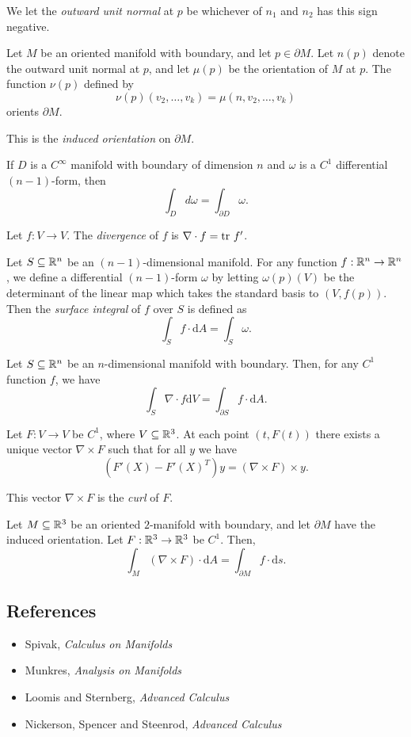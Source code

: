 \begin{defn}
    We let the \emph{outward unit normal} at $p$ be whichever of $n_1$ and $n_2$
    has this sign negative.
\end{defn}
\begin{prop}
    Let $M$ be an oriented manifold with boundary, and let $p\in\partial M$.
    Let $n(p)$ denote the outward unit normal at $p$, and let $\mu(p)$ be the
    orientation of $M$ at $p$. The function $\nu(p)$ defined by
    \[\nu(p)(v_2,\ldots,v_k)=\mu(n,v_2,\ldots,v_k)\] orients $\partial M$.
\end{prop}
\begin{defn}
    This is the \emph{induced orientation} on $\partial M$.
\end{defn}
\begin{thm}[Stokes]
    If $D$ is a $C^\infty$ manifold with boundary of dimension $n$ and $\omega$ is
    a $C^1$ differential $(n-1)$-form, then
    \[\int_D d\omega=\int_{\partial D}\omega.\]
\end{thm}
\begin{defn}
    Let $f:V\to V$. The \emph{divergence} of $f$ is $\nabla\cdot f=\mathrm{tr}\  f'$.
\end{defn}
\begin{defn}
    Let $S\subseteq\mathbb{R}^n$ be an $(n-1)$-dimensional manifold. For any function
    $f:\mathbb{R}^n\to\mathbb{R}^n$, we define a differential $(n-1)$-form $\omega$ by letting
    $\omega(p)(V)$ be the determinant of the linear map which
    takes the standard basis to $(V,f(p))$. Then the \emph{surface integral} of
    $f$ over $S$ is defined as
    \[\int_S f\cdot\mathrm dA=\int_S\omega.\]
\end{defn}
\begin{thm}
    Let $S\subseteq\mathbb{R}^n$ be an $n$-dimensional
    manifold with boundary. Then, for any $C^1$ function $f$, we have
    \[\int_S \nabla\cdot f\mathrm dV=\int_{\partial S}f\cdot\mathrm dA.\]
\end{thm}
\begin{prop}
    Let $F:V\to V$ be $C^1$, where $V\subseteq\mathbb{R}^3$. At each point $(t,F(t))$
    there exists a unique vector $\nabla\times F$ such that for all $y$ we have
    \[(F'(X)-F'(X)^T)y=(\nabla\times F)\times y.\]
\end{prop}
\begin{defn}
    This vector $\nabla\times F$ is the \emph{curl} of $F$.
\end{defn}
\begin{thm}[Stokes]
    Let $M\subseteq\mathbb{R}^3$ be an oriented $2$-manifold with boundary, and let
    $\partial M$ have the induced orientation. Let $F:\mathbb{R}^3\to\mathbb{R}^3$ be $C^1$.
    Then, \[\int_M (\nabla\times F)\cdot \mathrm dA=\int_{\partial
    M}f\cdot\mathrm ds.\]
\end{thm}
\subsection*{References}
\begin{itemize}
  \item Spivak, \emph{Calculus on Manifolds}
  \item Munkres, \emph{Analysis on Manifolds}
  \item Loomis and Sternberg, \emph{Advanced Calculus}
  \item Nickerson, Spencer and Steenrod, \emph{Advanced Calculus}
\end{itemize}
